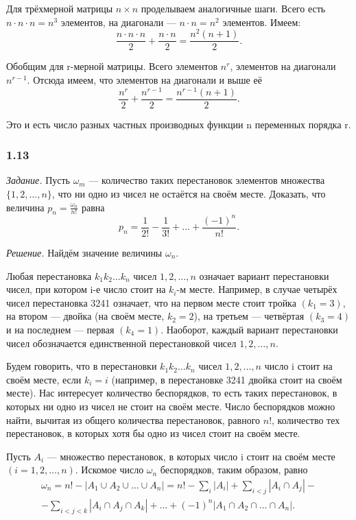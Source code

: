 Для трёхмерной матрицы $n\times n$ проделываем аналогичные шаги.
Всего есть $n \cdot n \cdot n = n^3$ элементов, на диагонали --- $n \cdot n = n^2$ элементов.
Имеем: $$ \frac{n \cdot n \cdot n}{2} + \frac{n \cdot n}{2} = \frac{n^2(n+1)}{2}.$$

Обобщим для r-мерной матрицы.
Всего элементов $n^r$, элементов на диагонали $n^{r-1}$.
Отсюда имеем, что элементов на диагонали и выше её
$$ \frac{n^r}{2} + \frac{n^{r-1}}{2} = \frac{n^{r-1}(n+1)}{2}.$$

Это и есть число разных частных производных функции n переменных порядка r.

\subsubsection*{1.13}

\textit{Задание.} Пусть $\omega_m$ --- количество таких перестановок элементов множества $\{1, 2,  \dotsc , n\}$, что ни одно из чисел не остаётся на своём месте.
Доказать, что величина $ p_n = \frac{\omega_n}{n!}$ равна
$$ p_n = \frac{1}{2!} - \frac{1}{3!} + \dotsc + \frac{\left(-1\right)^n}{n!}.$$

\textit{Решение.} Найдём значение величины $\omega_n$.

Любая перестановка $k_1k_2 \dotsc k_n$ чисел $1, 2,  \dotsc , n$ означает вариант перестановки чисел, при котором i-е число стоит на $k_i$-м месте.
Например, в случае четырёх чисел перестановка 3241 означает,
что на первом месте стоит тройка $ \left( k_1 = 3 \right) $,
на втором --- двойка (на своём месте, $k_2=2$), на третьем --- четвёртая $ \left( k_3 = 4 \right) $ и на последнем --- первая $ \left( k_4 = 1 \right) $.
Наоборот, каждый вариант перестановки чисел обозначается единственной перестановкой чисел $1, 2,  \dotsc , n$.

Будем говорить, что в перестановки
$ k_1 k_2 \dotsc k_n $ чисел $1, 2,  \dotsc , n$
число i стоит на своём месте, если $ k_i = i $ (например, в перестановке 3241 двойка стоит на своём месте).
Нас интересует количество беспорядков, то есть таких перестановок, в которых ни одно из чисел не стоит на своём месте.
Число беспорядков можно найти, вычитая из общего количества перестановок, равного $n!$, количество тех перестановок, в которых хотя бы одно из чисел стоит на своём месте.

Пусть $A_i$ --- множество перестановок, в которых число i стоит на своём месте $\left(i=1, 2,  \dotsc , n\right)$.
Искомое число $\omega_n$ беспорядков, таким образом, равно
\begin{equation*}
\begin{split}
\omega_n =
n! - |A_1 \cup A_2 \cup \dotsc \cup A_n| = n! - \sum \limits_i |A_i| + \sum \limits_{i<j} |A_i \cap A_j| - \\
-\sum \limits_{i<j<k} |A_i \cap A_j \cap A_k| + \dotsc + \left( -1 \right)^n |A_1 \cap A_2 \cap \dotsc \cap A_n|.
\end{split}
\end{equation*}

